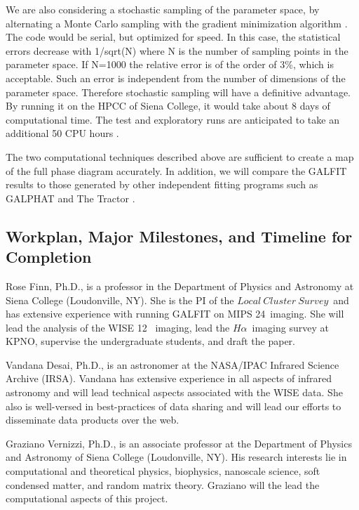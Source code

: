 \documentclass[12pt, preprint]{aastex}
\newcommand{\ha}{$H\alpha$}
\newcommand{\lcs}{$Local \ Cluster \ Survey $}
\begin{document}
{We are also considering a stochastic sampling of the parameter space,
by alternating a Monte Carlo sampling with the gradient minimization
algorithm \citep{pardo11}. The code would be serial, but optimized for speed. In this
case, the statistical errors decrease with 1/sqrt(N) where N is the
number of sampling points in the parameter space. If N=1000 the
relative error is of the order of 3\%, which is acceptable. Such an error
is independent from the number of dimensions of the parameter space.
Therefore  stochastic sampling will have a definitive advantage.
By running it on the HPCC of Siena College, it would take about 8
days of computational time. The test and exploratory runs are
anticipated to take an additional 50 CPU hours \citep[for a recent
application of this method see,][]{sala12}.

The two computational techniques described above are sufficient to
create a map of the full phase diagram accurately.  In addition, we
will compare the GALFIT results to those generated by other
independent fitting programs such as 
GALPHAT \citep{yoon11} and The Tractor \citep{lang16}.

\vspace*{-.9cm}\subsection{Workplan, Major Milestones, and Timeline for Completion }
\vspace*{-.3cm}
Rose Finn, Ph.D., is a professor in the Department of Physics
and Astronomy at Siena College (Loudonville, NY).  She is the PI of
the \lcs \ and has extensive experience with running GALFIT on MIPS
24\micron \ imaging.  She will lead the analysis of the WISE 12\micron
\ imaging, lead the \ha \ imaging survey at KPNO, supervise the undergraduate students, and draft the paper.

Vandana Desai, Ph.D., is an astronomer at the NASA/IPAC Infrared
  Science Archive (IRSA).   Vandana has extensive experience
in all aspects of infrared astronomy and will lead technical aspects
associated with the WISE data.  
She also is well-versed in best-practices of data sharing and will
lead our efforts to disseminate data products over the web.

Graziano Vernizzi, Ph.D., is an associate professor at the Department of
Physics and Astronomy of Siena College (Loudonville, NY).
His research interests lie in computational and theoretical
physics, biophysics, nanoscale science, soft condensed matter, and
random matrix theory. 
Graziano will the lead the computational
aspects of this project.

}
\end{document}
